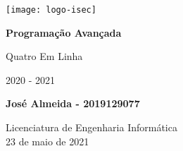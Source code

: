 \begin{titlepage}
	\begin{center}
		\texttt{[image: logo-isec]}
		
		\vspace*{\fill}
		
		\Huge
		\textbf{Programação Avançada}
		
		\huge
		Quatro Em Linha
		
		\vspace{0.5cm}
		\LARGE
		2020 - 2021
		
		\vspace{1.5cm}
		
		\textbf{José Almeida - 2019129077}
		
		\vfill
		\vspace*{\fill}
		
		\normalsize
		Licenciatura de Engenharia Informática \\
		23 de maio de 2021		
	\end{center}
\end{titlepage}